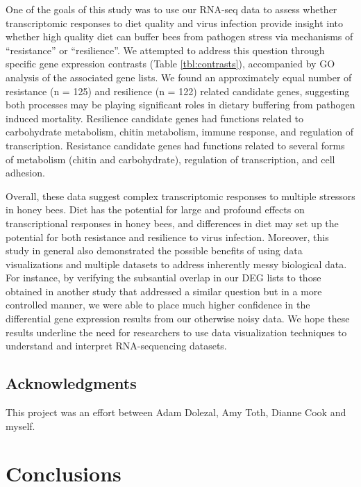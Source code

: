 \documentclass[11pt,a4paper,oldfontcommands,openany]{memoir}
\numberwithin{equation}{section} %
\begin{document}
One of the goals of this study was to use our RNA-seq data to assess whether transcriptomic responses to diet quality and virus infection provide insight into whether high quality diet can buffer bees from pathogen stress via mechanisms of ``resistance'' or ``resilience''. We attempted to address this question through specific gene expression contrasts (Table \ref{tbl:contrasts}), accompanied by GO analysis of the associated gene lists. We found an approximately equal number of resistance (n = 125) and resilience (n = 122) related candidate genes, suggesting both processes may be playing significant roles in dietary buffering from pathogen induced mortality. Resilience candidate genes had functions related to carbohydrate metabolism, chitin metabolism, immune response, and regulation of transcription. Resistance candidate genes had functions related to several forms of metabolism (chitin and carbohydrate), regulation of transcription, and cell adhesion.  

Overall, these data suggest complex transcriptomic responses to multiple stressors in honey bees. Diet has the potential for large and profound effects on transcriptional responses in honey bees, and differences in diet may set up the potential for both resistance and resilience to virus infection. Moreover, this study in general also demonstrated the possible benefits of using data visualizations and multiple datasets to address inherently messy biological data. For instance, by verifying the subsantial overlap in our DEG lists to those obtained in another study that addressed a similar question but in a more controlled manner, we were able to place much higher confidence in the differential gene expression results from our otherwise noisy data. We hope these results underline the need for researchers to use data visualization techniques to understand and interpret RNA-sequencing datasets.

\section{Acknowledgments}

This project was an effort between Adam Dolezal, Amy Toth, Dianne Cook and myself.


\chapter{Conclusions}
\end{document}
